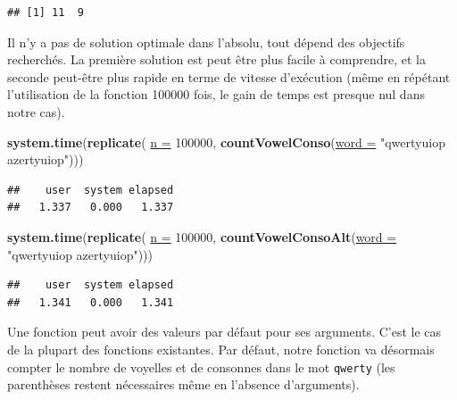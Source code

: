 \documentclass[twoside,symmetric]{book}
\newenvironment{Shaded}{}{}
\newcommand{\DataTypeTok}[1]{\underline{#1}}
\newcommand{\DecValTok}[1]{#1}
\newcommand{\KeywordTok}[1]{\textbf{#1}}
\newcommand{\NormalTok}[1]{#1}
\newcommand{\StringTok}[1]{#1}
\begin{document}
\begin{verbatim}
## [1] 11  9
\end{verbatim}

Il n'y a pas de solution optimale dans l'absolu, tout dépend des objectifs recherchés. La première solution est peut être plus facile à comprendre, et la seconde peut-être plus rapide en terme de vitesse d'exécution (même en répétant l'utilisation de la fonction 100000 fois, le gain de temps est presque nul dans notre cas).

\begin{Shaded}
\begin{Highlighting}[]
\KeywordTok{system.time}\NormalTok{(}\KeywordTok{replicate}\NormalTok{(}
  \DataTypeTok{n =} \DecValTok{100000}\NormalTok{, }
  \KeywordTok{countVowelConso}\NormalTok{(}\DataTypeTok{word =} \StringTok{"qwertyuiop azertyuiop"}\NormalTok{)))}
\end{Highlighting}
\end{Shaded}

\begin{verbatim}
##    user  system elapsed 
##   1.337   0.000   1.337
\end{verbatim}

\begin{Shaded}
\begin{Highlighting}[]
\KeywordTok{system.time}\NormalTok{(}\KeywordTok{replicate}\NormalTok{(}
  \DataTypeTok{n =} \DecValTok{100000}\NormalTok{, }
  \KeywordTok{countVowelConsoAlt}\NormalTok{(}\DataTypeTok{word =} \StringTok{"qwertyuiop azertyuiop"}\NormalTok{)))}
\end{Highlighting}
\end{Shaded}

\begin{verbatim}
##    user  system elapsed 
##   1.341   0.000   1.341
\end{verbatim}

Une fonction peut avoir des valeurs par défaut pour ses arguments. C'est le cas de la plupart des fonctions existantes. Par défaut, notre fonction va désormais compter le nombre de voyelles et de consonnes dans le mot \texttt{qwerty} (les parenthèses restent nécessaires même en l'absence d'arguments).
\end{document}
